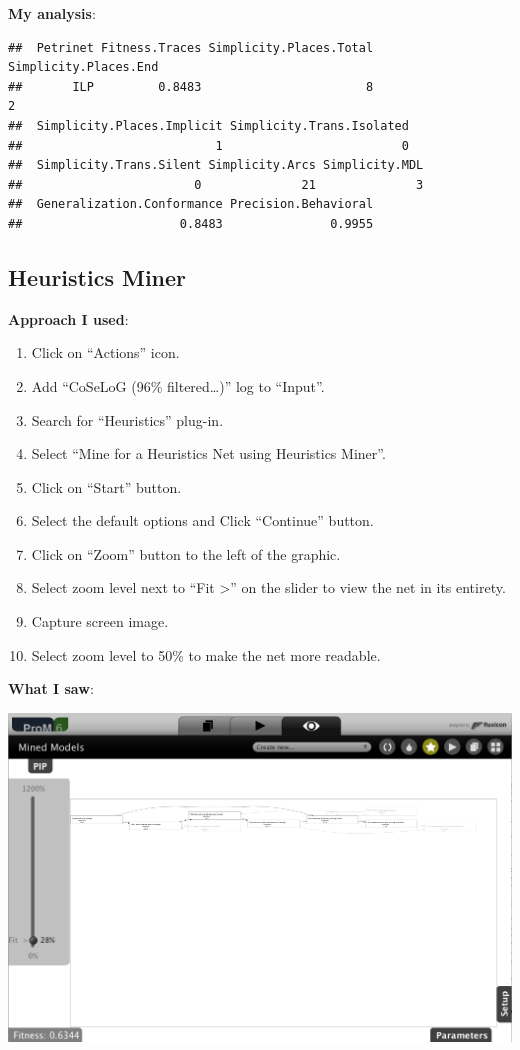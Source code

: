 \documentclass[]{article}
\begin{document}
\textbf{My analysis}:

\begin{verbatim}
##  Petrinet Fitness.Traces Simplicity.Places.Total Simplicity.Places.End
##       ILP         0.8483                       8                     2
##  Simplicity.Places.Implicit Simplicity.Trans.Isolated
##                           1                         0
##  Simplicity.Trans.Silent Simplicity.Arcs Simplicity.MDL
##                        0              21              3
##  Generalization.Conformance Precision.Behavioral
##                      0.8483               0.9955
\end{verbatim}

\subsection{Heuristics Miner}\label{heuristics-miner}

\textbf{Approach I used}:

\begin{enumerate}
\def\labelenumi{\arabic{enumi}.}
\itemsep1pt\parskip0pt
\item
  Click on ``Actions'' icon.
\item
  Add ``CoSeLoG (96\% filtered\ldots{})'' log to ``Input''.
\item
  Search for ``Heuristics'' plug-in.
\item
  Select ``Mine for a Heuristics Net using Heuristics Miner''.
\item
  Click on ``Start'' button.
\item
  Select the default options and Click ``Continue'' button.
\item
  Click on ``Zoom'' button to the left of the graphic.
\item
  Select zoom level next to ``Fit \textgreater{}'' on the slider to view
  the net in its entirety.
\item
  Capture screen image.
\item
  Select zoom level to 50\% to make the net more readable.
\end{enumerate}

\textbf{What I saw}:

\includegraphics{CoSeLoG_Step_05_Filter96_Heuristics_Net.png}
\end{document}
